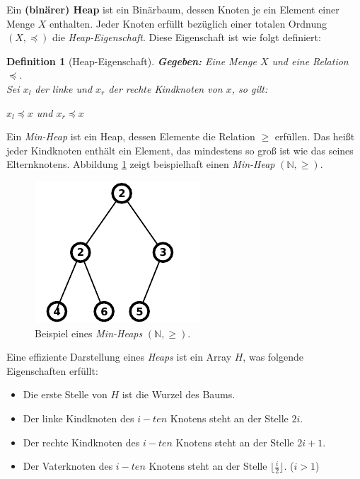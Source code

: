 \documentclass[a4paper,11pt]{scrartcl}%
\theoremstyle{change}
\theoremstyle{nonumberplain}
\theoremstyle{change}
\newtheorem{definition}[theorem]{Definition}
\theoremstyle{nonumberplain}
\theoremstyle{change}
\theoremstyle{nonumberplain}
\begin{document}
Ein \textbf{(binärer) Heap} ist ein Binärbaum, dessen Knoten je ein Element einer Menge $X$ enthalten. Jeder Knoten erfüllt bezüglich einer totalen Ordnung $(X,\preceq)$ die \textit{Heap-Eigenschaft}. Diese Eigenschaft ist wie folgt definiert:

\begin{definition} [Heap-Eigenschaft]
	\textbf{Gegeben:} Eine Menge $X$ und eine Relation $\preceq$.\\
	Sei $x_{l}$ der linke und $x_{r}$ der rechte Kindknoten von $x$, so gilt:\\
	\begin{center}{$x_{l} \preceq x$ und $x_{r} \preceq x$}\end{center}
	 
\end{definition}

Ein \textit{Min-Heap} ist ein Heap, dessen Elemente die Relation $\geq$ erfüllen. Das heißt jeder Kindknoten enthält ein Element, das mindestens so groß ist wie das seines Elternknotens. Abbildung \ref{fig:min_heap_example} zeigt beispielhaft einen \textit{Min-Heap} $(\mathbb{N}, \geq )$.

\begin{figure}[h]
	    \centering
		\includegraphics[scale=0.9]{./pics/min_heap_example}
		 \caption{Beispiel eines \textit{Min-Heaps} $(\mathbb{N}, \geq )$.}
		 \label{fig:min_heap_example}
\end{figure}
\newpage

Eine effiziente Darstellung eines \textit{Heaps} ist ein Array $H$, was folgende Eigenschaften erfüllt:

\begin{itemize}
	\item Die erste Stelle von $H$ ist die Wurzel des Baums. \label{heap_array_prop_1}
	\item Der linke Kindknoten des $i-ten$ Knotens steht an der Stelle $2i$.
	\item Der rechte Kindknoten des $i-ten$ Knotens steht an der Stelle $2i + 1$.
	\item Der Vaterknoten des $i-ten$ Knotens steht an der Stelle $\lfloor\frac{i}{2}\rfloor$. ($i>1$)
\end{itemize}
	
\end{document}
